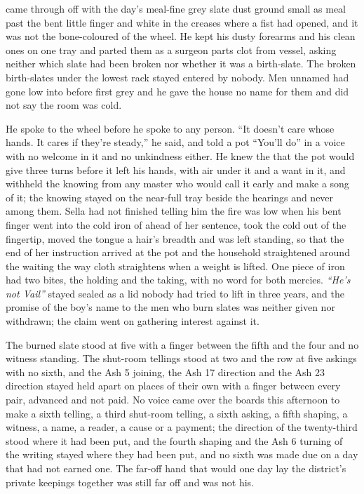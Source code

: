  came through  off  with the day’s meal-fine grey slate dust ground small as meal past the bent little finger and white in the creases where a fist had opened, and it was not the bone-coloured  of the wheel. He kept his dusty forearms and his clean ones on one tray and parted them as a surgeon parts clot from vessel, asking neither which slate had been broken nor whether it was a birth-slate. The broken birth-slates under the lowest rack stayed entered by nobody. Men unnamed had gone low into  before first grey and he gave the house no name for them and did not say the room was cold.

He spoke to the wheel before he spoke to any person. “It doesn’t care whose hands. It cares if they’re steady,” he said, and told a pot “You’ll do” in a voice with no welcome in it and no unkindness either. He knew the  that the pot would give three turns before it left his hands, with air under it and a want in it, and withheld the knowing from any  master who would call it early and make a song of it; the knowing stayed on the near-full tray beside the hearings and never among them. Sella had not finished telling him the fire was low when his bent finger went into the cold iron of  ahead of her sentence, took the cold out of the fingertip, moved the tongue a hair’s breadth and was left standing, so that the end of her instruction arrived at the pot and the household straightened around the waiting the way cloth straightens when a weight is lifted. One piece of iron had two bites, the holding and the taking, with no  word for both mercies. \emph{“He’s not Vail”} stayed sealed as a lid nobody had tried to lift in three years, and the promise of the boy’s name to the men who burn slates was neither given nor withdrawn; the claim went on gathering interest against it.

The burned slate stood at five with a finger between the fifth and the four and no witness standing. The shut-room tellings stood at two and the row at five askings with no sixth, and the Ash 5 joining, the Ash 17 direction and the Ash 23 direction stayed held apart on places of their own with a finger between every pair, advanced and not paid. No voice came over the boards this afternoon to make a sixth telling, a third shut-room telling, a sixth asking, a fifth shaping, a witness, a name, a reader, a cause or a payment; the direction of the twenty-third stood where it had been put, and the fourth shaping and the Ash 6 turning of the writing stayed where they had been put, and no sixth was made due on a day that had not earned one. The far-off hand that would one day lay the district’s private keepings together was still far off and was not his.

